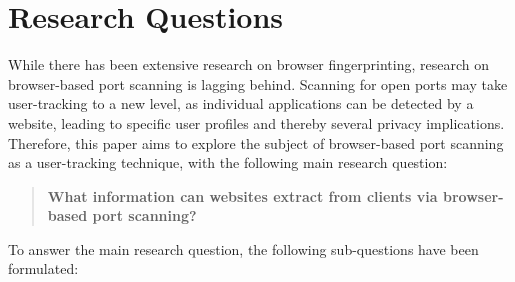 \chapter{Research Questions}

While there has been extensive research on browser fingerprinting, research on browser-based port scanning is lagging behind. Scanning for open ports may take user-tracking to a new level, as individual applications can be detected by a website, leading to specific user profiles and thereby several privacy implications. Therefore, this paper aims to explore the subject of browser-based port scanning as a user-tracking technique, with the following main research question:

\begin{quote}
\textbf{What information can websites extract from clients via browser-based port scanning?}
\end{quote}






To answer the main research question, the following sub-questions have been formulated:

